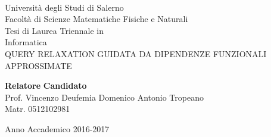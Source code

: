 \begin{center}
\\[0.2truecm]
{\Large Università degli Studi di Salerno}\\[0.2truecm]
{\large Facoltà di Scienze Matematiche Fisiche e Naturali}\\
\hrulefill
\vfill
{\large Tesi di Laurea Triennale in }\\[0.2truecm]
{\Large Informatica}\\
\vfill\vfill
{\large QUERY RELAXATION GUIDATA DA DIPENDENZE FUNZIONALI APPROSSIMATE}
\vfill\vfill


 {\bf Relatore} \hfill {\bf Candidato}\ \ \\
Prof. Vincenzo Deufemia \hfill Domenico Antonio Tropeano \\
\hfill Matr. 0512102981
\vfill
\hrulefill 

Anno Accademico 2016-2017

\end{center}